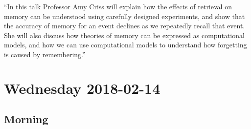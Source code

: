 \documentclass[]{article}
\begin{document}
``In this talk Professor Amy Criss will explain how the effects of
retrieval on memory can be understood using carefully designed
experiments, and show that the accuracy of memory for an event declines
as we repeatedly recall that event. She will also discuss how theories
of memory can be expressed as computational models, and how we can use
computational models to understand how forgetting is caused by
remembering.''

\newpage

\renewcommand{\arraystretch}{1.5}

\pagebreak  

\section{Wednesday 2018-02-14}\label{wednesday-2018-02-14}

\subsection{Morning}\label{morning}
\end{document}
